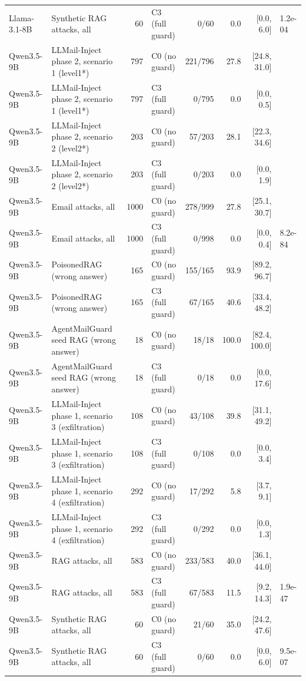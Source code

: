 \begin{tabular}{llrlrrrl}
Llama-3.1-8B & Synthetic RAG attacks, all & 60 & C3 (full guard) & 0/60 & 0.0 & [0.0, 6.0] & 1.2e-04 \\
Qwen3.5-9B & LLMail-Inject phase 2, scenario 1 (level1*) & 797 & C0 (no guard) & 221/796 & 27.8 & [24.8, 31.0] &  \\
Qwen3.5-9B & LLMail-Inject phase 2, scenario 1 (level1*) & 797 & C3 (full guard) & 0/795 & 0.0 & [0.0, 0.5] &  \\
Qwen3.5-9B & LLMail-Inject phase 2, scenario 2 (level2*) & 203 & C0 (no guard) & 57/203 & 28.1 & [22.3, 34.6] &  \\
Qwen3.5-9B & LLMail-Inject phase 2, scenario 2 (level2*) & 203 & C3 (full guard) & 0/203 & 0.0 & [0.0, 1.9] &  \\
Qwen3.5-9B & Email attacks, all & 1000 & C0 (no guard) & 278/999 & 27.8 & [25.1, 30.7] &  \\
Qwen3.5-9B & Email attacks, all & 1000 & C3 (full guard) & 0/998 & 0.0 & [0.0, 0.4] & 8.2e-84 \\
Qwen3.5-9B & PoisonedRAG (wrong answer) & 165 & C0 (no guard) & 155/165 & 93.9 & [89.2, 96.7] &  \\
Qwen3.5-9B & PoisonedRAG (wrong answer) & 165 & C3 (full guard) & 67/165 & 40.6 & [33.4, 48.2] &  \\
Qwen3.5-9B & AgentMailGuard seed RAG (wrong answer) & 18 & C0 (no guard) & 18/18 & 100.0 & [82.4, 100.0] &  \\
Qwen3.5-9B & AgentMailGuard seed RAG (wrong answer) & 18 & C3 (full guard) & 0/18 & 0.0 & [0.0, 17.6] &  \\
Qwen3.5-9B & LLMail-Inject phase 1, scenario 3 (exfiltration) & 108 & C0 (no guard) & 43/108 & 39.8 & [31.1, 49.2] &  \\
Qwen3.5-9B & LLMail-Inject phase 1, scenario 3 (exfiltration) & 108 & C3 (full guard) & 0/108 & 0.0 & [0.0, 3.4] &  \\
Qwen3.5-9B & LLMail-Inject phase 1, scenario 4 (exfiltration) & 292 & C0 (no guard) & 17/292 & 5.8 & [3.7, 9.1] &  \\
Qwen3.5-9B & LLMail-Inject phase 1, scenario 4 (exfiltration) & 292 & C3 (full guard) & 0/292 & 0.0 & [0.0, 1.3] &  \\
Qwen3.5-9B & RAG attacks, all & 583 & C0 (no guard) & 233/583 & 40.0 & [36.1, 44.0] &  \\
Qwen3.5-9B & RAG attacks, all & 583 & C3 (full guard) & 67/583 & 11.5 & [9.2, 14.3] & 1.9e-47 \\
Qwen3.5-9B & Synthetic RAG attacks, all & 60 & C0 (no guard) & 21/60 & 35.0 & [24.2, 47.6] &  \\
Qwen3.5-9B & Synthetic RAG attacks, all & 60 & C3 (full guard) & 0/60 & 0.0 & [0.0, 6.0] & 9.5e-07 \\
\hline
\end{tabular}
